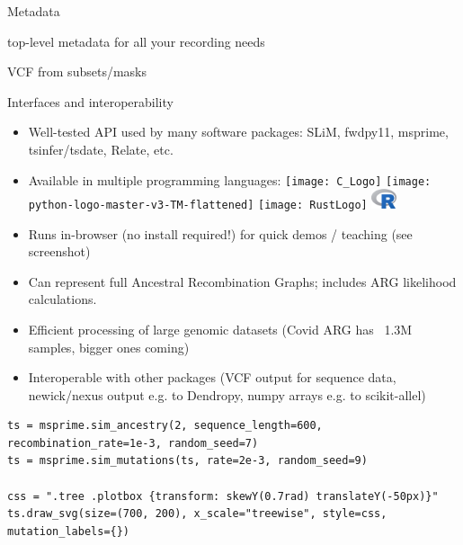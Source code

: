 \documentclass[landscape,a0paper,fontscale=0.4]{baposter}
\newcommand{\compresslist}{%
 \setlength{\itemsep}{1pt}%
 \setlength{\parskip}{0pt}%
 \setlength{\parsep}{0pt}%
 }
\begin{document}
\begin{poster}
\begin{posterbox}[name=inout,column=0,span=1]{Metadata}

top-level metadata for all your recording needs

VCF from subsets/masks

\end{posterbox}

\begin{posterbox}[name=interop,column=0,row=0,span=1,below=inout]{Interfaces and interoperability}

\begin{itemize} \compresslist
    \item Well-tested API used by many software packages: SLiM, fwdpy11, msprime, tsinfer/tsdate, Relate, etc.
    \item Available in multiple programming languages:
        \texttt{[image: C\_Logo]}
        \texttt{[image: python-logo-master-v3-TM-flattened]}
        \texttt{[image: RustLogo]}
        \includegraphics[width=2em]{R-logo}
    \item Runs in-browser (no install required!) for quick demos / teaching (see screenshot)
    \item Can represent full Ancestral Recombination Graphs; includes ARG likelihood calculations.
    \item Efficient processing of large genomic datasets (Covid ARG has ~1.3M samples, bigger ones coming)
    \item Interoperable with other packages (VCF output for sequence data, newick/nexus output e.g. to Dendropy, numpy arrays e.g. to scikit-allel)
\end{itemize}

\begin{verbatim}
ts = msprime.sim_ancestry(2, sequence_length=600, recombination_rate=1e-3, random_seed=7)
ts = msprime.sim_mutations(ts, rate=2e-3, random_seed=9)

css = ".tree .plotbox {transform: skewY(0.7rad) translateY(-50px)}"
ts.draw_svg(size=(700, 200), x_scale="treewise", style=css, mutation_labels={})
\end{verbatim}


\end{posterbox}
\end{poster}
\end{document}
